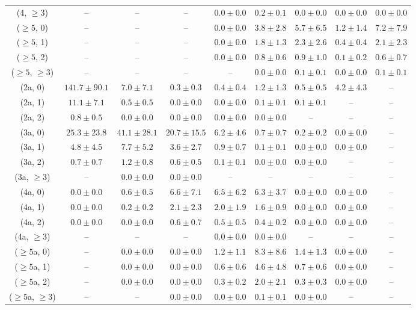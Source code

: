 \begin{table}[h!]
{\begin{tabular}{ccccccccc}
	(4, $\ge3$) & -- & -- & -- & $0.0\pm 0.0$ & $0.2\pm 0.1$ & $0.0\pm 0.0$ & $0.0\pm 0.0$ & $0.0\pm 0.0$ \\[0.5ex] 
	($\ge5$, 0) & -- & -- & -- & $0.0\pm 0.0$ & $3.8\pm 2.8$ & $5.7\pm 6.5$ & $1.2\pm 1.4$ & $7.2\pm 7.9$ \\[0.5ex] 
	($\ge5$, 1) & -- & -- & -- & $0.0\pm 0.0$ & $1.8\pm 1.3$ & $2.3\pm 2.6$ & $0.4\pm 0.4$ & $2.1\pm 2.3$ \\[0.5ex] 
	($\ge5$, 2) & -- & -- & -- & $0.0\pm 0.0$ & $0.8\pm 0.6$ & $0.9\pm 1.0$ & $0.1\pm 0.2$ & $0.6\pm 0.7$ \\[0.5ex] 
	($\ge5$, $\ge3$) & -- & -- & -- & -- & $0.0\pm 0.0$ & $0.1\pm 0.1$ & $0.0\pm 0.0$ & $0.1\pm 0.1$ \\[0.5ex] 
	(2a, 0) & $141.7\pm 90.1$ & $7.0\pm 7.1$ & $0.3\pm 0.3$ & $0.4\pm 0.4$ & $1.2\pm 1.3$ & $0.5\pm 0.5$ & $4.2\pm 4.3$ & -- \\[0.5ex] 
	(2a, 1) & $11.1\pm 7.1$ & $0.5\pm 0.5$ & $0.0\pm 0.0$ & $0.0\pm 0.0$ & $0.1\pm 0.1$ & $0.1\pm 0.1$ & -- & -- \\[0.5ex] 
	(2a, 2) & $0.8\pm 0.5$ & $0.0\pm 0.0$ & $0.0\pm 0.0$ & $0.0\pm 0.0$ & $0.0\pm 0.0$ & -- & -- & -- \\[0.5ex] 
	(3a, 0) & $25.3\pm 23.8$ & $41.1\pm 28.1$ & $20.7\pm 15.5$ & $6.2\pm 4.6$ & $0.7\pm 0.7$ & $0.2\pm 0.2$ & $0.0\pm 0.0$ & -- \\[0.5ex] 
	(3a, 1) & $4.8\pm 4.5$ & $7.7\pm 5.2$ & $3.6\pm 2.7$ & $0.9\pm 0.7$ & $0.1\pm 0.1$ & $0.0\pm 0.0$ & $0.0\pm 0.0$ & -- \\[0.5ex] 
	(3a, 2) & $0.7\pm 0.7$ & $1.2\pm 0.8$ & $0.6\pm 0.5$ & $0.1\pm 0.1$ & $0.0\pm 0.0$ & $0.0\pm 0.0$ & -- & -- \\[0.5ex] 
	(3a, $\ge3$) & -- & $0.0\pm 0.0$ & $0.0\pm 0.0$ & -- & -- & -- & -- & -- \\[0.5ex] 
	(4a, 0) & $0.0\pm 0.0$ & $0.6\pm 0.5$ & $6.6\pm 7.1$ & $6.5\pm 6.2$ & $6.3\pm 3.7$ & $0.0\pm 0.0$ & $0.0\pm 0.0$ & -- \\[0.5ex] 
	(4a, 1) & $0.0\pm 0.0$ & $0.2\pm 0.2$ & $2.1\pm 2.3$ & $2.0\pm 1.9$ & $1.6\pm 0.9$ & $0.0\pm 0.0$ & $0.0\pm 0.0$ & -- \\[0.5ex] 
	(4a, 2) & $0.0\pm 0.0$ & $0.0\pm 0.0$ & $0.6\pm 0.7$ & $0.5\pm 0.5$ & $0.4\pm 0.2$ & $0.0\pm 0.0$ & $0.0\pm 0.0$ & -- \\[0.5ex] 
	(4a, $\ge3$) & -- & -- & -- & $0.0\pm 0.0$ & $0.0\pm 0.0$ & -- & -- & -- \\[0.5ex] 
	($\ge5$a, 0) & -- & $0.0\pm 0.0$ & $0.0\pm 0.0$ & $1.2\pm 1.1$ & $8.3\pm 8.6$ & $1.4\pm 1.3$ & $0.0\pm 0.0$ & -- \\[0.5ex] 
	($\ge5$a, 1) & -- & $0.0\pm 0.0$ & $0.0\pm 0.0$ & $0.6\pm 0.6$ & $4.6\pm 4.8$ & $0.7\pm 0.6$ & $0.0\pm 0.0$ & -- \\[0.5ex] 
	($\ge5$a, 2) & -- & $0.0\pm 0.0$ & $0.0\pm 0.0$ & $0.3\pm 0.2$ & $2.0\pm 2.1$ & $0.3\pm 0.3$ & $0.0\pm 0.0$ & -- \\[0.5ex] 
	($\ge5$a, $\ge3$) & -- & -- & $0.0\pm 0.0$ & $0.0\pm 0.0$ & $0.1\pm 0.1$ & $0.0\pm 0.0$ & -- & -- \\[0.5ex] 
	\hline
	\hline
\end{tabular}}
\end{table}
